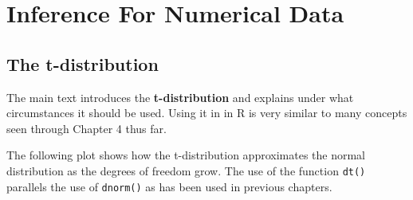 \documentclass{report}\usepackage[]{graphicx}\usepackage[]{color}
\begin{document}
\newpage
\chapter{Inference For Numerical Data}
\minitoc

\vspace{0.5cm} 

\section{The t-distribution}
The main text introduces the \textbf{t-distribution} and explains under what circumstances it should be used.  Using it in in \textsf{R} is very similar to many concepts seen through Chapter 4 thus far.  

The following plot shows how the t-distribution approximates the normal distribution as the degrees of freedom grow.  The use of the function \texttt{dt()} parallels the use of \texttt{dnorm()} as has been used in previous chapters.  
\end{document}
